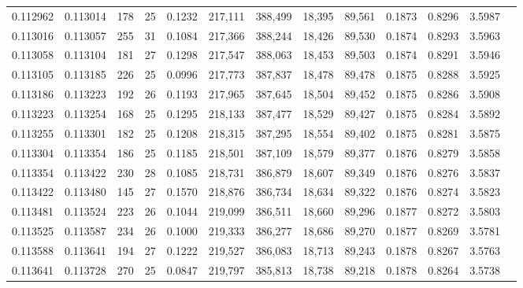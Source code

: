 \begin{tabular}{rrrrrrrrrrrrr}
0.112962 & 0.113014 & 178 &  25 &                                     0.1232 & 217,111 & 388,499 &  18,395 &  89,561 & 0.1873 & 0.8296 & 3.5987 \\
0.113016 & 0.113057 & 255 &  31 &                                     0.1084 & 217,366 & 388,244 &  18,426 &  89,530 & 0.1874 & 0.8293 & 3.5963 \\
0.113058 & 0.113104 & 181 &  27 &                                     0.1298 & 217,547 & 388,063 &  18,453 &  89,503 & 0.1874 & 0.8291 & 3.5946 \\
0.113105 & 0.113185 & 226 &  25 &                                     0.0996 & 217,773 & 387,837 &  18,478 &  89,478 & 0.1875 & 0.8288 & 3.5925 \\
0.113186 & 0.113223 & 192 &  26 &                                     0.1193 & 217,965 & 387,645 &  18,504 &  89,452 & 0.1875 & 0.8286 & 3.5908 \\
0.113223 & 0.113254 & 168 &  25 &                                     0.1295 & 218,133 & 387,477 &  18,529 &  89,427 & 0.1875 & 0.8284 & 3.5892 \\
0.113255 & 0.113301 & 182 &  25 &                                     0.1208 & 218,315 & 387,295 &  18,554 &  89,402 & 0.1875 & 0.8281 & 3.5875 \\
0.113304 & 0.113354 & 186 &  25 &                                     0.1185 & 218,501 & 387,109 &  18,579 &  89,377 & 0.1876 & 0.8279 & 3.5858 \\
0.113354 & 0.113422 & 230 &  28 &                                     0.1085 & 218,731 & 386,879 &  18,607 &  89,349 & 0.1876 & 0.8276 & 3.5837 \\
0.113422 & 0.113480 & 145 &  27 &                                     0.1570 & 218,876 & 386,734 &  18,634 &  89,322 & 0.1876 & 0.8274 & 3.5823 \\
0.113481 & 0.113524 & 223 &  26 &                                     0.1044 & 219,099 & 386,511 &  18,660 &  89,296 & 0.1877 & 0.8272 & 3.5803 \\
0.113525 & 0.113587 & 234 &  26 &                                     0.1000 & 219,333 & 386,277 &  18,686 &  89,270 & 0.1877 & 0.8269 & 3.5781 \\
0.113588 & 0.113641 & 194 &  27 &                                     0.1222 & 219,527 & 386,083 &  18,713 &  89,243 & 0.1878 & 0.8267 & 3.5763 \\
0.113641 & 0.113728 & 270 &  25 &                                     0.0847 & 219,797 & 385,813 &  18,738 &  89,218 & 0.1878 & 0.8264 & 3.5738 \\

\end{tabular}
